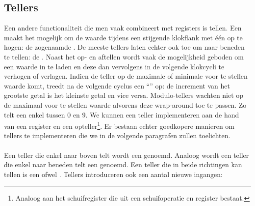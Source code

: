 \subsection{Tellers}
Een andere functionaliteit die men vaak combineert met registers is tellen. Een  maakt het mogelijk om de waarde tijdens een stijgende klokflank met \'e\'en op te hogen: de zogenaamde . De meeste tellers laten echter ook toe om naar beneden te tellen: de . Naast het op- en aftellen wordt vaak de mogelijkheid geboden om een waarde in te laden en deze dan vervolgens in de volgende klokcycli te verhogen of verlagen. Indien de teller op de maximale of minimale voor te stellen waarde komt, treedt na de volgende cyclus een ``'' op: de increment van het grootste getal is het kleinste getal en vice versa. Modulo-tellers wachten niet op de maximaal voor te stellen waarde alvorens deze wrap-around toe te passen. Zo telt een  enkel tussen $0$ en $9$. We kunnen een teller implementeren aan de hand van een register en een opteller\footnote{Analoog aan het schuifregister die uit een schuifoperatie en register bestaat.}. Er bestaan echter goedkopere manieren om tellers te implementeren die we in de volgende paragrafen zullen toelichten.

\paragraph{}
Een teller die enkel naar boven telt wordt een  genoemd. Analoog wordt een teller die enkel naar beneden telt een  genoemd. Een teller die in beide richtingen kan tellen is een  ofwel . Tellers introduceren ook een aantal nieuwe ingangen:

